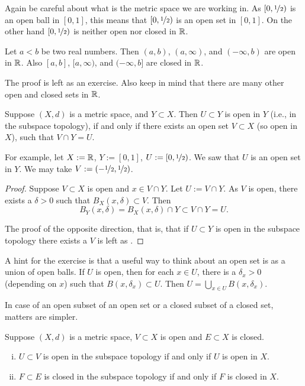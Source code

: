 Again be careful about what is the metric space we are working in.
As $[0,\nicefrac{1}{2})$ is
an open ball in $[0,1]$, this means that $[0,\nicefrac{1}{2})$ is
an open set in $[0,1]$.  On the other hand $[0,\nicefrac{1}{2})$
is neither open nor closed in ${\mathbb{R}}$.

\begin{prop} \label{prop:topology:intervals:openclosed}
Let $a < b$ be two real numbers.  Then $(a,b)$, $(a,\infty)$,
and $(-\infty,b)$ are open in ${\mathbb{R}}$.
Also $[a,b]$, $[a,\infty)$,
and $(-\infty,b]$ are closed in ${\mathbb{R}}$.
\end{prop}

The proof is left as an exercise.  Also keep in mind that
there are many other open and
closed sets in ${\mathbb{R}}$.

\begin{prop} \label{prop:topology:subspaceopen}
Suppose $(X,d)$ is a metric space, and $Y \subset X$.  Then $U \subset Y$
is open in $Y$ (i.e., in the subspace topology), if and only if
there exists an open set $V \subset X$ (so open in $X$), such that
$V \cap Y = U$.
\end{prop}

For example, let $X := {\mathbb{R}}$, $Y:=[0,1]$, $U := [0,\nicefrac{1}{2})$.
We saw that $U$ is an open set in $Y$.
We may take $V := (-\nicefrac{1}{2},\nicefrac{1}{2})$.

\begin{proof}
Suppose $V \subset X$ is open and $x \in V \cap Y$.
Let $U := V \cap Y$.
As $V$ is open, there
exists a $\delta > 0$ such that $B_X(x,\delta) \subset V$.
Then
\begin{equation*}
B_Y(x,\delta) = B_X(x,\delta) \cap Y \subset V \cap Y = U .
\end{equation*}

The proof of the opposite direction, that is, that if $U \subset Y$
is open in the subspace topology there exists a $V$ is left as
.
\end{proof}

A hint for the exercise is that
a useful way to think about an open set is as a union of open balls.  If $U$ is
open, then for each $x \in U$, there is a $\delta_x > 0$ (depending on $x$) such that
$B(x,\delta_x) \subset U$.  Then $U = \bigcup_{x\in U} B(x,\delta_x)$.

In case of an open subset of an open set or a closed subset of a closed
set, matters are simpler.

\begin{prop} \label{prop:topology:subspacesame}
Suppose $(X,d)$ is a metric space, $V \subset X$ is open
and $E \subset X$ is closed.
\begin{enumerate}[(i)]
\item \label{prop:topology:subspacesame:i}
$U \subset V$ is open in the subspace topology if and only if $U$ is open
in $X$.
\item \label{prop:topology:subspacesame:ii}
$F \subset E$ is closed in the subspace topology if and only if $F$ is
closed in $X$.
\end{enumerate}
\end{prop}

